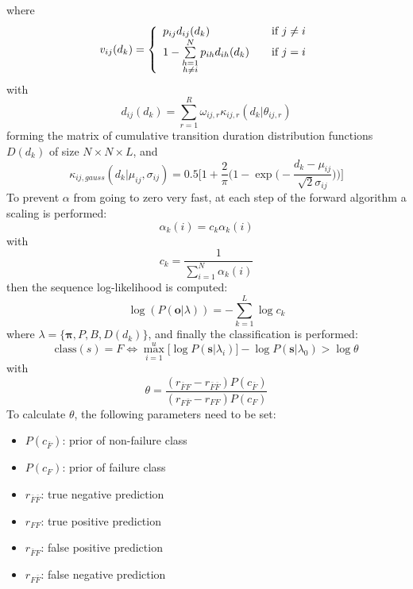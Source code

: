 \documentclass[12pt]{article} %
\begin{document}
where
\begin{equation}
    v_{ij}(d_k) = \left\{
        \begin{array}{l l}
            p_{ij} d_{ij}(d_k)
                & \quad \text{if $j \neq i$}\\
            1 - \sum\limits_{\substack{h=1 \\ h \neq i}}^{N} p_{ih} d_{ih}(d_k)
                & \quad \text{if $j = i$}
        \end{array} \right.
\end{equation}
with
\begin{equation}
    d_{ij}(d_k) = \sum_{r=1}^{R} \omega_{ij,r}\kappa_{ij,r}(d_k|\theta_{ij, r})
\end{equation}
forming the matrix of cumulative transition duration distribution functions
$ D(d_k) $ of size $ N \times N \times L $, and
\begin{equation}
    \kappa_{ij, gauss}(d_k | \mu_{ij}, \sigma_{ij}) = 
        0.5\bigg [1 + \frac{2}{\pi}\Big (
            1 - \exp \big (-\frac{d_k - \mu_{ij}}{\sqrt 2 \sigma_{ij}}\big )
        \Big ) \bigg ]
\end{equation}
To prevent $ \alpha $ from going to zero very fast, at each step of the forward
algorithm a scaling is performed:
\begin{equation}
    \alpha_k(i) = c_k \alpha_k(i)
\end{equation}
with
\begin{equation}
    c_k = \frac{1}{\sum\limits_{i=1}^{N} \alpha_k(i)}
\end{equation}
then the sequence log-likelihood is computed:
\begin{equation}
    \log(P(\boldsymbol{o}|\lambda)) = -\sum\limits_{k=1}^{L} \log c_k
\end{equation}
where $ \lambda = \{\boldsymbol{\pi}, P, B, D(d_k) \} $,  and finally the
classification is performed:
\begin{equation}
    \text{class}(s) = F \iff \max_{i=1}^{u} \big [
        \log P(\boldsymbol{s}|\lambda_i)
    \big ] - \log P(\boldsymbol{s}|\lambda_0) > \log \theta
\end{equation}
with
\begin{equation}
    \theta = \frac{(r_{\bar{F}F} - r_{\bar{F}\bar{F}})P(c_{\bar{F}})}
        {(r_{F \bar{F}} - r_{FF})P(c_{F})}
\end{equation}
To calculate $ \theta $, the following parameters need to be set:
\begin{itemize}
    \item $ P(c_{\bar{F}}) $: prior of non-failure class
    \item $ P(c_F) $: prior of failure class
    \item $ r_{\bar{F}\bar{F}} $: true negative prediction
    \item $ r_{FF} $: true positive prediction
    \item $ r_{\bar{F}F} $: false positive prediction
    \item $ r_{F\bar{F}} $: false negative prediction
\end{itemize}
\end{document}
